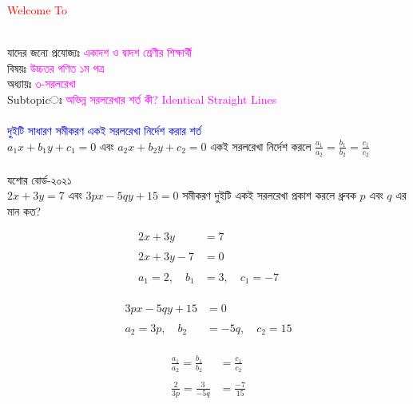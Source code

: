 \documentclass{article}
\begin{document}
 
	\Large
	\textcolor{red}{Welcome To} 
	\\
	\\
	যাদের জন্যে প্রযোজ্যঃ  	\textcolor{magenta}{একাদশ ও দ্বাদশ শ্রেণীর শিক্ষার্থী} \\
	বিষয়ঃ \textcolor{magenta}{উচ্চতর গণিত ১ম পত্র} \\
	অধ্যায়ঃ \textcolor{magenta}{৩-সরলরেখা}\\ 
	Subtopicঃ  \textcolor{magenta}{ অভিন্ন  সরলরেখার শর্ত  কী?  Identical Straight Lines   }\\
\\
\textcolor{blue}{	দুইটি সাধারণ সমীকরণ একই সরলরেখা নির্দেশ করার শর্ত }\\
		$a_1x+b_1y+c_1=0$ এবং	$a_2x+b_2y+c_2=0$  একই সরলরেখা নির্দেশ করলে $\frac{a_1}{a_2}=\frac{b_1}{b_2}=\frac{c_1}{c_2}$\\ 
		\\ 
	যশোর বোর্ড-২০২১\\ 
$2x+3y=7$ এবং $3px-5qy+15=0$ সমীকরণ দুইটি একই সরলরেখা প্রকাশ করলে ধ্রুবক $p$ এবং $q$ এর মান কত? \\
\begin{multicols}{2}
	\begin{align*}
		2x+3y&=7\\
		\\
		2x+3y-7&=0\\
		\\
		a_1=2,\quad b_1&=3,\quad c_1=-7
	\end{align*}
	\\
	\begin{align*}
		3px-5qy+15&=0\\
		\\
		a_2=3p,\quad b_2&=-5q,\quad c_2=15\\
	\end{align*}
\end{multicols}
\begin{align*}
	\frac{a_1}{a_2}=\frac{b_1}{b_2}&=\frac{c_1}{c_2}\\
	\\
	\frac{2}{3p}=\frac{3}{-5q}&=\frac{-7}{15}
\end{align*}
\end{document}
